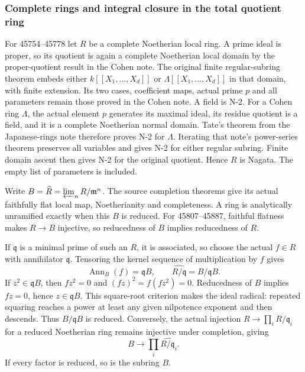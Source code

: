 \subsubsection{Complete rings and integral closure in the total quotient ring}\label{algebra-proof-067-complete-rings-and-integral-closure-in-the-total-quotient-ring}

For 45754--45778 let \(R\) be a complete Noetherian local ring. A prime ideal is proper, so its quotient is again a complete Noetherian local domain by the proper-quotient result in the Cohen note. The original finite regular-subring theorem embeds either \(k[[X_1,\ldots,X_d]]\) or \(\Lambda[[X_1,\ldots,X_d]]\) in that domain, with finite extension. Its two cases, coefficient maps, actual prime \(p\) and all parameters remain those proved in the Cohen note. A field is N-2. For a Cohen ring \(\Lambda\), the actual element \(p\) generates its maximal ideal, its residue quotient is a field, and it is a complete Noetherian normal domain. Tate's theorem from the Japanese-rings note therefore proves N-2 for \(\Lambda\). Iterating that note's power-series theorem preserves all variables and gives N-2 for either regular subring. Finite domain ascent then gives N-2 for the original quotient. Hence \(R\) is Nagata. The empty list of parameters is included.

Write \(B=\widehat R=\varprojlim_n R/\mathfrak m^n\). The source completion theorems give its actual faithfully flat local map, Noetherianity and completeness. A ring is analytically unramified exactly when this \(B\) is reduced. For 45807--45887, faithful flatness makes \(R\to B\) injective, so reducedness of \(B\) implies reducedness of \(R\).

If \(\mathfrak q\) is a minimal prime of such an \(R\), it is associated, so choose the actual \(f\in R\) with annihilator \(\mathfrak q\). Tensoring the kernel sequence of multiplication by \(f\) gives \[
 \operatorname{Ann}_B(f)=\mathfrak qB,
 \qquad \widehat{R/\mathfrak q}=B/\mathfrak qB.
\] If \(z^2\in\mathfrak qB\), then \(fz^2=0\) and \((fz)^2=f(fz^2)=0\). Reducedness of \(B\) implies \(fz=0\), hence \(z\in\mathfrak qB\). This square-root criterion makes the ideal radical: repeated squaring reaches a power at least any given nilpotence exponent and then descends. Thus \(B/\mathfrak qB\) is reduced. Conversely, the actual injection \(R\to\prod_i R/\mathfrak q_i\) for a reduced Noetherian ring remains injective under completion, giving \[
 B\longrightarrow\prod_i\widehat{R/\mathfrak q_i}.
\] If every factor is reduced, so is the subring \(B\).

